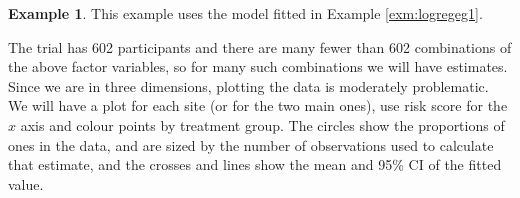 \documentclass[
  openany]{book}
\newenvironment{Shaded}{\begin{snugshade}}{\end{snugshade}}
\newcommand{\AttributeTok}[1]{\textcolor[rgb]{0.13,0.29,0.53}{#1}}
\newcommand{\CommentTok}[1]{\textcolor[rgb]{0.56,0.35,0.01}{\textit{#1}}}
\newcommand{\DecValTok}[1]{\textcolor[rgb]{0.00,0.00,0.81}{#1}}
\newcommand{\DocumentationTok}[1]{\textcolor[rgb]{0.56,0.35,0.01}{\textbf{\textit{#1}}}}
\newcommand{\FunctionTok}[1]{\textcolor[rgb]{0.13,0.29,0.53}{\textbf{#1}}}
\newcommand{\NormalTok}[1]{#1}
\newcommand{\OtherTok}[1]{\textcolor[rgb]{0.56,0.35,0.01}{#1}}
\newcommand{\SpecialCharTok}[1]{\textcolor[rgb]{0.81,0.36,0.00}{\textbf{#1}}}
\newcommand{\StringTok}[1]{\textcolor[rgb]{0.31,0.60,0.02}{#1}}
\theoremstyle{definition}
\theoremstyle{definition}
\newtheorem{example}{Example}[chapter]
\theoremstyle{definition}
\theoremstyle{definition}
\theoremstyle{remark}
\begin{document}
\begin{example}
This example uses the model fitted in Example \ref{exm:logregeg1}.

The trial has 602 participants and there are many fewer than 602 combinations of the above factor variables, so for many such combinations we will have estimates. Since we are in three dimensions, plotting the data is moderately problematic. We will have a plot for each site (or for the two main ones), use risk score for the \(x\) axis and colour points by treatment group. The circles show the proportions of ones in the data, and are sized by the number of observations used to calculate that estimate, and the crosses and lines show the mean and 95\% CI of the fitted value.

\begin{Shaded}
\end{Shaded}
\end{example}
\end{document}
